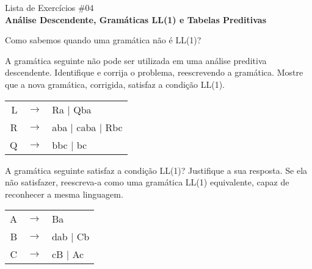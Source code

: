 \documentclass{compiladores}
\begin{document}
\begin{center}
{\LARGE Lista de Exercícios \#04}\\
{\bf Análise Descendente, Gramáticas LL(1) e Tabelas Preditivas}
\end{center}

\begin{listanumerada}
\item
Como sabemos quando uma gramática não é LL(1)?

\item A gramática seguinte não pode ser utilizada em uma análise
  preditiva descendente. Identifique e corrija o problema,
  reescrevendo a gramática. Mostre que a nova gramática, corrigida,
  satisfaz a condição LL(1). \\
  \begin{tabular}{rcl}
    L & $\rightarrow$ & Ra | Qba \\
    R & $\rightarrow$ & aba | caba | Rbc \\
    Q & $\rightarrow$ & bbc | bc \\
  \end{tabular}

\item A gramática seguinte satisfaz a condição LL(1)? Justifique a sua
  resposta. Se ela não satisfazer, reescreva-a como uma gramática
  LL(1) equivalente, capaz de reconhecer a mesma linguagem. \\
  \begin{tabular}{rcl}
    A & $\rightarrow$ & Ba \\
    B & $\rightarrow$ & dab | Cb \\
    C & $\rightarrow$ & cB | Ac \\
  \end{tabular}


\end{listanumerada}
\end{document}

